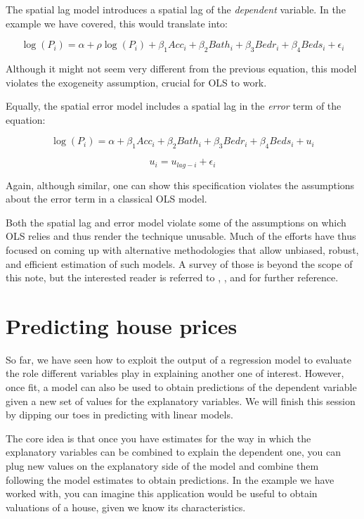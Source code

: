 \documentclass[
]{book}
\begin{document}
The spatial lag model introduces a spatial lag of the \emph{dependent} variable. In the example we have covered, this would translate into:

\[
\log(P_i) = \alpha + \rho \log(P_i) + \beta_1 Acc_i + \beta_2 Bath_i + \beta_3 Bedr_i + \beta_4 Beds_i + \epsilon_i
\]

Although it might not seem very different from the previous equation, this model violates the exogeneity assumption, crucial for OLS to work.

Equally, the spatial error model includes a spatial lag in the \emph{error} term of the equation:

\[
\log(P_i) = \alpha + \beta_1 Acc_i + \beta_2 Bath_i + \beta_3 Bedr_i + \beta_4 Beds_i + u_i
\]

\[
u_i = u_{lag-i} + \epsilon_i
\]

Again, although similar, one can show this specification violates the assumptions about the error term in a classical OLS model.

Both the spatial lag and error model violate some of the assumptions on which OLS relies and thus render the technique unusable. Much of the efforts have thus focused on coming up with alternative methodologies that allow unbiased, robust, and efficient estimation of such models. A survey of those is beyond the scope of this note, but the interested reader is referred to \citet{anselin1988spatial}, \citet{anselin2003spatial}, and \citet{anselin2014modern} for further reference.

\hypertarget{predicting-house-prices}{%
\section{Predicting house prices}\label{predicting-house-prices}}

So far, we have seen how to exploit the output of a regression model to evaluate the role different variables play in explaining another one of interest. However, once fit, a model can also be used to obtain predictions of the dependent variable given a new set of values for the explanatory variables. We will finish this session by dipping our toes in predicting with linear models.

The core idea is that once you have estimates for the way in which the explanatory variables can be combined to explain the dependent one, you can plug new values on the explanatory side of the model and combine them following the model estimates to obtain predictions. In the example we have worked with, you can imagine this application would be useful to obtain valuations of a house, given we know its characteristics.
\end{document}
